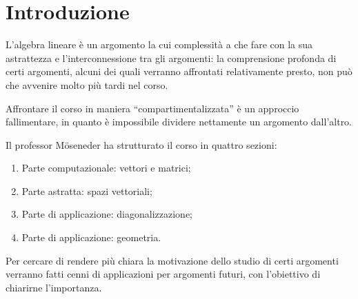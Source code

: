 \chapter*{Introduzione}
L'algebra lineare è un argomento la cui complessità a che fare con la sua astrattezza e l'interconnessione tra gli argomenti: la comprensione profonda di certi argomenti, alcuni dei quali verranno affrontati relativamente presto, non può che avvenire molto più tardi nel corso.

Affrontare il corso in maniera ``compartimentalizzata'' è un approccio fallimentare, in quanto è impossibile dividere nettamente un argomento dall'altro.

Il professor Möseneder ha strutturato il corso in quattro sezioni:
\begin{enumerate}
    \item Parte computazionale: vettori e matrici;
    \item Parte astratta: spazi vettoriali;
    \item Parte di applicazione: diagonalizzazione;
    \item Parte di applicazione: geometria.
\end{enumerate}

Per cercare di rendere più chiara la motivazione dello studio di certi argomenti verranno fatti cenni di applicazioni per argomenti futuri, con l'obiettivo di chiarirne l'importanza.